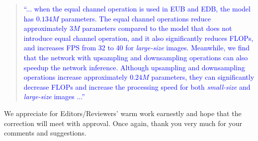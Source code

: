 \documentclass[a4paper,twoside,10pt]{reviewresponse}
\newcommand\tgray[1]{\textcolor{blue}{#1}}
\begin{document}
\begin{quotation}
	\tgray{
		``... when the equal channel operation is used in EUB and EDB, the model has $0.134M$ parameters. The equal channel operations reduce approximately $3M$ parameters compared to the model that does not introduce equal channel operation, and it also significantly reduces FLOPs, and increases FPS from 32 to 40 for \textit{large-size} images. Meanwhile, we find that the network with upsampling and downsampling operations can also speedup the network inference. Although upsampling and downsampling operations increase approximately $0.24M$ parameters, they can significantly decrease FLOPs and increase the processing speed for both \textit{small-size} and \textit{large-size} images ...''
}
\end{quotation}



\newpage
We appreciate for Editors/Reviewers' warm work earnestly and hope that the correction will meet with approval. Once again, thank you very much for your comments and suggestions.
\end{document}
